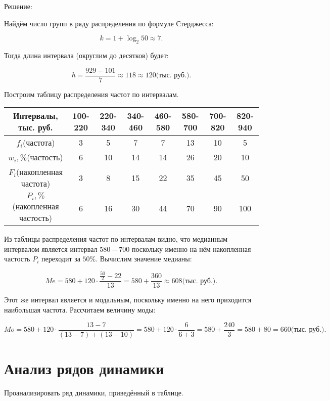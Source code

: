 \documentclass[fleqn]{article}
\begin{document}
\begin{center}Решение:\end{center}

Найдём число групп в ряду распределения по формуле Стерджесса:

$$k=1+\log_2{50}\approx7.$$

Тогда длина интервала (округлим до десятков) будет:

$$h=\frac{929-101}{7}\approx118\approx120\textit{(тыс. руб.)}.$$

Построим таблицу распределения частот по интервалам.

\bgroup
\def\arraystretch{1.5}
\setlength{}

\begin{center}
\begin{tabular}{|c|c|c|c|c|c|c|c|}
\hline
Интервалы, тыс. руб. & 100-220 & 220-340 & 340-460 & 460-580 & 580-700 & 700-820 & 820-940 \\
\hline
$f_i$(частота) & 3 & 5 & 7 & 7 & 13 & 10 & 5 \\
\hline
$w_i,\%$(частость) & 6 & 10 & 14 & 14 & 26 & 20 & 10 \\
\hline
$F_i$(накопленная частота) & 3 & 8 & 15 & 22 & 35 & 45 & 50 \\
\hline
$P_i,\%$(накопленная частость) & 6 & 16 & 30 & 44 & 70 & 90 & 100 \\
\hline
\end{tabular}
\end{center}
\egroup

Из таблицы распределения частот по интервалам видно, что медианным интервалом является интервал $580-700$ поскольку именно на нём накопленная частость $P_i$ переходит за $50\%$. Вычислим значение медианы:

$$Me=580+120\cdot\frac{\frac{50}{2}-22}{13}=580+\frac{360}{13}\approx608\textit{(тыс. руб.)}.$$

Этот же интервал является и модальным, поскольку именно на него приходится наибольшая частота. Рассчитаем величину моды:

$$Mo=580+120\cdot\frac{13-7}{(13-7)+(13-10)}=580+120\cdot\frac{6}{6+3}=580+\frac{240}{3}=580+80=660\textit{(тыс. руб.)}.$$

\bigskip

\section*{Анализ рядов динамики}

Проанализировать ряд динамики, приведённый в таблице.
\end{document}
